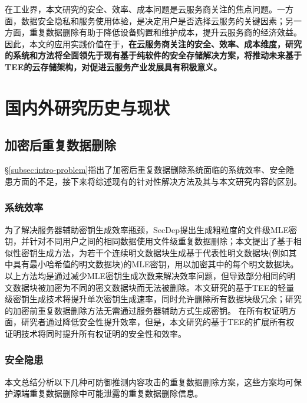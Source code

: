 在工业界，本文研究的安全、效率、成本问题是云服务商关注的焦点问题。一方面，数据安全隐私和服务使用体验，是决定用户是否选择云服务的关键因素；另一方面，重复数据删除有助于降低设备购置和维护成本，提升云服务商的经济效益。因此，本文的应用实践价值在于，\textbf{在云服务商关注的安全、效率、成本维度，研究的系统和方法将全面领先于现有基于纯软件的安全存储解决方案，将推动未来基于TEE的云存储架构，对促进云服务产业发展具有积极意义。}

\section{国内外研究历史与现状}
\label{sec:compare}

\subsection{加密后重复数据删除}
\label{subsec:compare-deduplication}

\S\ref{subsec:intro-problem}指出了加密后重复数据删除系统面临的系统效率、安全隐患方面的不足，接下来将综述现有的针对性解决方法及其与本文研究内容的区别。

\subsubsection{系统效率}
\label{subsubsec:compare-deduplication-performance}

为了解决服务器辅助密钥生成效率瓶颈，SecDep提出生成粗粒度的文件级MLE密钥，并针对不同用户之间的相同数据使用文件级重复数据删除；本文提出了基于相似性密钥生成方法，为若干个连续明文数据块生成基于代表性明文数据块(例如其中具有最小哈希值的明文数据块)的MLE密钥，用以加密其中的每个明文数据块。以上方法均是通过减少MLE密钥生成次数来解决效率问题，但导致部分相同的明文数据块被加密为不同的密文数据块而无法被删除。本文研究的基于TEE的轻量级密钥生成技术将提升单次密钥生成速率，同时允许删除所有数据块级冗余；研究的加密前重复数据删除方法无需通过服务器辅助方式生成密钥。
在所有权证明方面，研究者通过降低安全性提升效率，但是，本文研究的基于TEE的扩展所有权证明技术将同时提升所有权证明的安全性和效率。

\subsubsection{安全隐患}
\label{subsubsec:compare-deduplication-security}

本文总结分析以下几种可防御推测内容攻击的重复数据删除方案，这些方案均可保护源端重复数据删除中可能泄露的重复数据删除信息。

